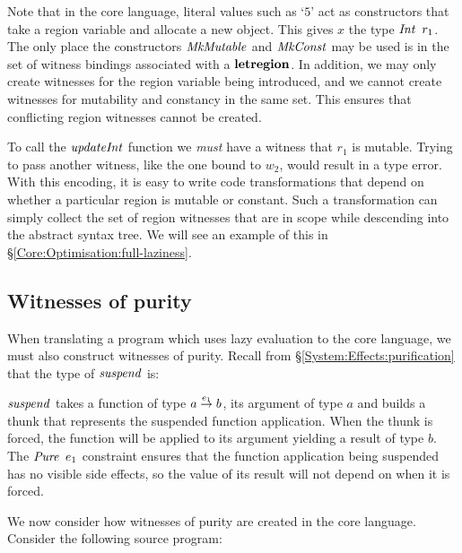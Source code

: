 Note that in the core language, literal values such as `$5$' act as constructors that take a region variable and allocate a new object. This gives $x$ the type $\operatorname{\mathit{Int}} \ r_1$. The only place the constructors $\operatorname{\mathit{MkMutable}}$ and $\operatorname{\mathit{MkConst}}$ may be used is in the set of witness bindings associated with a $\textrm{\textbf{letregion}}$. In addition, we may only create witnesses for the region variable being introduced, and we cannot create witnesses for mutability and constancy in the same set. This ensures that conflicting region witnesses cannot be created.

To call the $\operatorname{\mathit{updateInt}}$ function we \emph{must} have a witness that $r_1$ is mutable. Trying to pass another witness, like the one bound to $w_2$, would result in a type error. With this encoding, it is easy to write code transformations that depend on whether a particular region is mutable or constant. Such a transformation can simply collect the set of region witnesses that are in scope while descending into the abstract syntax tree. We will see an example of this in \S\ref{Core:Optimisation:full-laziness}.


\subsection{Witnesses of purity}
\label{Core:Witnesses:purity}
When translating a program which uses lazy evaluation to the core language, we must also construct witnesses of purity. Recall from \S\ref{System:Effects:purification} that the type of $\operatorname{\mathit{suspend}}$ is:


$\operatorname{\mathit{suspend}}$ takes a function of type $a \stackrel{e_1}{\rightarrow} b$, its argument of type $a$ and builds a thunk that represents the suspended function application. When the thunk is forced, the function will be applied to its argument yielding a result of type $b$. The $\operatorname{\mathit{Pure}} \ e_1$ constraint ensures that the function application being suspended has no visible side effects, so the value of its result will not depend on when it is forced.

We now consider how witnesses of purity are created in the core language. Consider the following source program:


